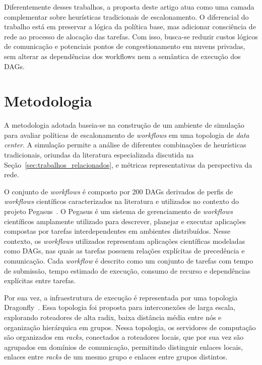 \documentclass[12pt]{article}
\begin{document}
Diferentemente desses trabalhos, a proposta deste artigo atua como uma camada complementar sobre heurísticas tradicionais de escalonamento. 
%
O diferencial do trabalho está em preservar a lógica da política base, mas adicionar consciência de rede ao processo de alocação das tarefas. 
%
Com isso, busca-se reduzir custos lógicos de comunicação e potenciais pontos de congestionamento em nuvens privadas, sem alterar as dependências dos workflows nem a semântica de execução dos DAGs.


\section{Metodologia}
\label{sec:metodologia}

A metodologia adotada baseia-se na construção de um ambiente de simulação para avaliar políticas de escalonamento de \textit{workflows} em uma topologia de \textit{data center}. 
%
A simulação permite a análise de diferentes combinações de heurísticas tradicionais, oriundas da literatura especializada discutida na Seção~\ref{sec:trabalhos_relacionados}, e métricas representativas da perspectiva da rede.

O conjunto de \textit{workflows} é composto por 200 DAGs derivados de perfis de \textit{workflows} científicos caracterizados na literatura e utilizados no contexto do projeto Pegasus~\cite{juve2013characterizing,deelman2019pegasus}. 
%
O Pegasus é um sistema de gerenciamento de \textit{workflows} científicos amplamente utilizado para descrever, planejar e executar aplicações compostas por tarefas interdependentes em ambientes distribuídos. 
%
Nesse contexto, os \textit{workflows} utilizados representam aplicações científicas modeladas como DAGs, nas quais as tarefas possuem relações explícitas de precedência e comunicação.
%
Cada \textit{workflow} é descrito como um conjunto de tarefas com tempo de submissão, tempo estimado de execução, consumo de recurso e dependências explícitas entre tarefas.

Por sua vez, a infraestrutura de execução é representada por uma topologia Dragonfly~\cite{kim2008technology}. 
%
Essa topologia foi proposta para interconexões de larga escala, explorando roteadores de alta radix, baixa distância média entre nós e organização hierárquica em grupos. 
%
Nessa topologia, os servidores de computação são organizados em \textit{racks}, conectados a roteadores locais, que por sua vez são agrupados em domínios de comunicação, permitindo distinguir enlaces locais, enlaces entre \textit{racks} de um mesmo grupo e enlaces entre grupos distintos.
\end{document}
